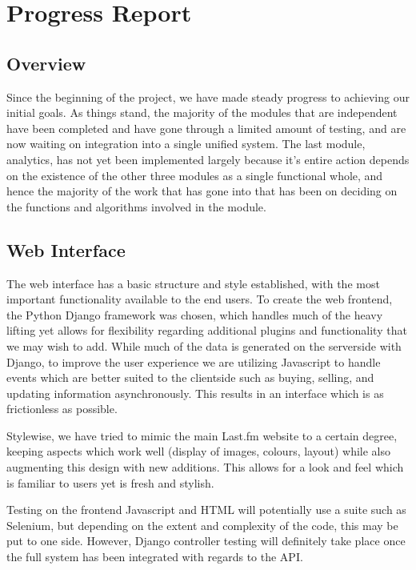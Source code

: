 \documentclass[a4paper,10pt,twoside]{article}
\begin{document}
\section{Progress Report}
\subsection{Overview}

Since the beginning of the project, we have made steady progress to achieving our initial goals. As things stand, the majority of the modules that are independent have been completed and have gone through a limited amount of testing, and are now waiting on integration into a single unified system. The last module, analytics, has not yet been implemented largely because it's entire action depends on the existence of the other three modules as a single functional whole, and hence the majority of the work that has gone into that has been on deciding on the functions and algorithms involved in the module.

\subsection{Web Interface}

The web interface has a basic structure and style established, with the most important functionality available to the end users. To create the web frontend, the Python Django framework was chosen, which handles much of the heavy lifting yet allows for flexibility regarding additional plugins and functionality that we may wish to add. While much of the data is generated on the serverside with Django, to improve the user experience we are utilizing Javascript to handle events which are better suited to the clientside such as buying, selling, and updating information asynchronously. This results in an interface which is as frictionless as possible.

Stylewise, we have tried to mimic the main Last.fm website to a certain degree, keeping aspects which work well (display of images, colours, layout) while also augmenting this design with new additions. This allows for a look and feel which is familiar to users yet is fresh and stylish.
 
Testing on the frontend Javascript and HTML will potentially use a suite such as Selenium, but depending on the extent and complexity of the code, this may be put to one side. However, Django controller testing will definitely take place once the full system has been integrated with regards to the API.
\end{document}
